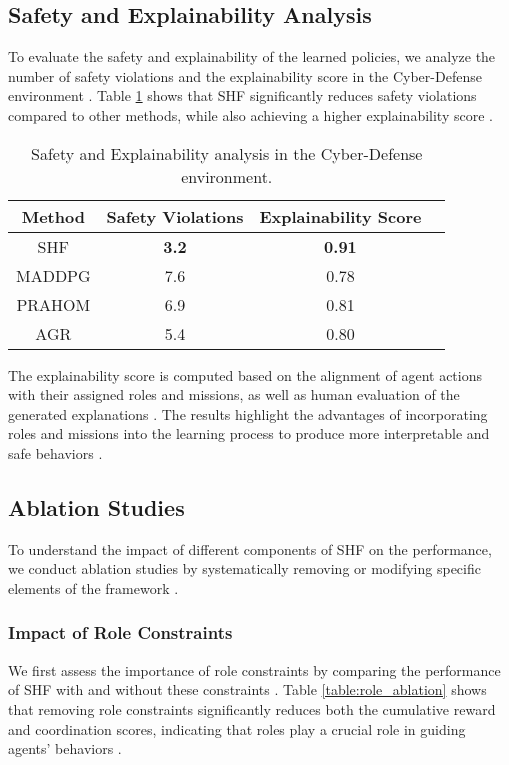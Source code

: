 \documentclass[sigconf,anonymous]{aamas}
\begin{document}
\subsection{Safety and Explainability Analysis}
To evaluate the safety and explainability of the learned policies, we analyze the number of safety violations and the explainability score in the Cyber-Defense environment \cite{ghosal2021explainable}. Table \ref{table:safety_explainability} shows that SHF significantly reduces safety violations compared to other methods, while also achieving a higher explainability score \cite{wei2019safe, su2021toward}.

\begin{table}[ht]
\centering
\caption{Safety and Explainability analysis in the Cyber-Defense environment.}
\label{table:safety_explainability}
\begin{tabular}{|c|c|c|c|}
\hline
\textbf{Method} & \textbf{Safety Violations} & \textbf{Explainability Score} \\ \hline
SHF & \textbf{3.2} & \textbf{0.91} \\ \hline
MADDPG & 7.6 & 0.78 \\ \hline
PRAHOM & 6.9 & 0.81 \\ \hline
AGR & 5.4 & 0.80 \\ \hline
\end{tabular}
\end{table}

The explainability score is computed based on the alignment of agent actions with their assigned roles and missions, as well as human evaluation of the generated explanations \cite{ghosal2021explainable}. The results highlight the advantages of incorporating roles and missions into the learning process to produce more interpretable and safe behaviors \cite{hubner2010moise, soule2024}.

\subsection{Ablation Studies}
To understand the impact of different components of SHF on the performance, we conduct ablation studies by systematically removing or modifying specific elements of the framework \cite{foerster2018counterfactual}.

\subsubsection{Impact of Role Constraints}
We first assess the importance of role constraints by comparing the performance of SHF with and without these constraints \cite{hubner2010moise}. Table \ref{table:role_ablation} shows that removing role constraints significantly reduces both the cumulative reward and coordination scores, indicating that roles play a crucial role in guiding agents' behaviors \cite{hubner2010moise, castaneda2019policy}.
\end{document}
